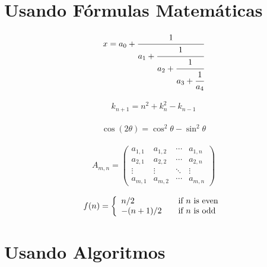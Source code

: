 \section{Usando Fórmulas Matemáticas}



\begin{equation}
	\begin{aligned}
		x = a_0 + \cfrac{1}{a_1
			+ \cfrac{1}{a_2
				+ \cfrac{1}{a_3 + \cfrac{1}{a_4} } } }
	\end{aligned}
\end{equation}


\begin{equation}
	\begin{aligned}
		k_{n+1} = n^2 + k_n^2 - k_{n-1}
	\end{aligned}
\end{equation}


\begin{equation}
	\begin{aligned}
		\cos (2\theta) = \cos^2 \theta - \sin^2 \theta
	\end{aligned}
\end{equation}


\begin{equation}
	\begin{aligned}
		A_{m,n} =
		\begin{pmatrix}
			a_{1,1} & a_{1,2} & \cdots & a_{1,n} \\
			a_{2,1} & a_{2,2} & \cdots & a_{2,n} \\
			\vdots  & \vdots  & \ddots & \vdots  \\
			a_{m,1} & a_{m,2} & \cdots & a_{m,n}
		\end{pmatrix}
	\end{aligned}
\end{equation}


\begin{equation}
	\begin{aligned}
		f(n) = \left\{ 
		\begin{array}{l l}
			n/2 & \quad \text{if $n$ is even}\\
			-(n+1)/2 & \quad \text{if $n$ is odd}
		\end{array} \right.
	\end{aligned}
\end{equation}






\section{Usando Algoritmos}


